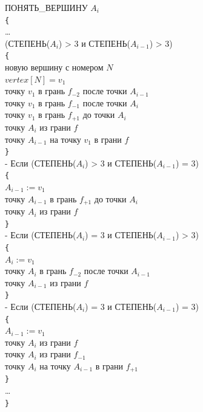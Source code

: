 \documentclass[a4paper,12pt, titlepage]{article}
\begin{document}
\begin{flushleft}
 ПОНЯТЬ\_ВЕРШИНУ $A_{i}$\\
\verb"{"\\
\quad\ldots\\

 (СТЕПЕНЬ($A_{i}$) > 3 и СТЕПЕНЬ($A_{i - 1}$) > 3)\\
\quad\verb"{"\\
\quad{} новую вершину с номером $N$\\
\quad\quad$vertex[N] = v_{1}$\\
\quad{} точку $v_{1}$ в грань $f_{-2}$ после точки $A_{i - 1}$\\
\quad{} точку $v_{1}$ в грань $f_{-1}$ после точки $A_{i}$\\
\quad{} точку $v_{1}$ в грань $f_{+1}$ до точки $A_{i}$\\
\quad{} точку $A_{i}$ из грани $f$\\
\quad{} точку $A_{i - 1}$ на точку $v_{1}$ в грани $f$\\
\quad\verb"}"\\

 - Если (СТЕПЕНЬ($A_{i}$) > 3 и СТЕПЕНЬ($A_{i - 1}$) = 3)\\
\quad\verb"{"\\
\quad\quad$A_{i - 1} := v_{1}$\\
\quad{} точку $A_{i - 1}$ в грань $f_{+1}$ до точки $A_{i}$\\
\quad{} точку $A_{i}$ из грани $f$\\
\quad\verb"}"\\

 - Если (СТЕПЕНЬ($A_{i}$) = 3 и СТЕПЕНЬ($A_{i - 1}$) > 3)\\
\quad\verb"{"\\
\quad\quad$A_{i} := v_{1}$\\
\quad{} точку $A_{i}$ в грань $f_{-2}$ после точки $A_{i - 1}$\\
\quad{} точку $A_{i - 1}$ из грани $f$\\
\quad\verb"}"\\

 - Если (СТЕПЕНЬ($A_{i}$) = 3 и СТЕПЕНЬ($A_{i - 1}$) = 3)\\
\quad\verb"{"\\
\quad\quad$A_{i - 1} := v_{1}$\\
\quad{} точку $A_{i}$ из грани $f$\\
\quad{} точку $A_{i}$ из грани $f_{-1}$\\
\quad{} точку $A_{i}$ на точку $A_{i - 1}$ в грани $f_{+1}$\\
\quad\verb"}"\\

\quad\ldots\\
\verb"}"\\

\end{flushleft}
\end{document}
